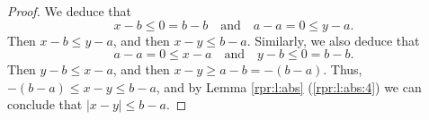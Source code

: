 \begin{proof}
	We deduce that
	$$
		x - b \leq 0 = b - b \quad \text{and} \quad a - a = 0 \leq y - a.
	$$
	Then $x - b \leq y - a$, and then $x - y \leq b - a$. Similarly, we also deduce that
	$$
		a - a = 0 \leq x - a \quad \text{and} \quad y - b \leq 0 = b - b.
	$$
	Then $y - b \leq x - a$, and then $x - y \geq a - b = -(b - a)$. Thus, $-(b - a) \leq x - y \leq b - a$, and by Lemma \ref{rpr:l:abs} (\ref{rpr:l:abs:4}) we can conclude that $|x - y| \leq b - a$.
\end{proof}